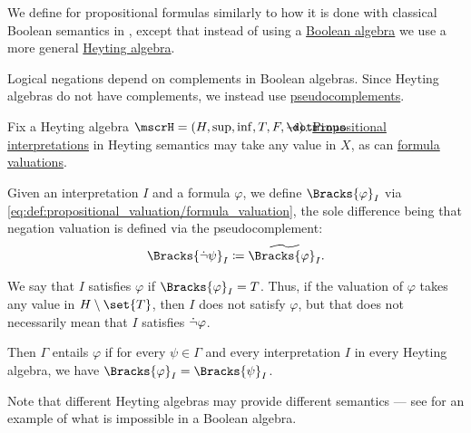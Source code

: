 \begin{definition}\label{def:propositional_heyting_algebra_semantics}
  We define  for propositional formulas similarly to how it is done with classical Boolean semantics in , except that instead of using a \hyperref[def:boolean_algebra]{Boolean algebra} we use a more general \hyperref[def:heyting_algebra]{Heyting algebra}.

  Logical negations depend on complements in Boolean algebras. Since Heyting algebras do not have complements, we instead use \hyperref[def:heyting_algebra/pseudocomplement]{pseudocomplements}.

  Fix a Heyting algebra \( \mscrH = (H, \sup, \inf, T, F, \synimplies) \). \hyperref[def:propositional_valuation/interpretation]{Propositional interpretations} in Heyting semantics may take any value in \( X \), as can \hyperref[def:propositional_valuation/formula_valuation]{formula valuations}.

  Given an interpretation \( I \) and a formula \( \varphi \), we define \( \Bracks{\varphi}_I \) via \eqref{eq:def:propositional_valuation/formula_valuation}, the sole difference being that negation valuation is defined via the pseudocomplement:
  \begin{equation*}
    \Bracks{\synneg \psi}_I \coloneqq \widetilde{\Bracks{\varphi}_I}.
  \end{equation*}

  We say that \( I \) satisfies \( \varphi \) if \( \Bracks{\varphi}_I = T \). Thus, if the valuation of \( \varphi \) takes any value in \( H \setminus \set{ T } \), then \( I \) does not satisfy \( \varphi \), but that does not necessarily mean that \( I \) satisfies \( \dot\neg \varphi \).

  Then \( \Gamma \) entails \( \varphi \) if for every \( \psi \in \Gamma \) and every interpretation \( I \) in every Heyting algebra, we have \( \Bracks{\varphi}_I = \Bracks{\psi}_I \).

  Note that different Heyting algebras may provide different semantics --- see  for an example of what is impossible in a Boolean algebra.
\end{definition}

